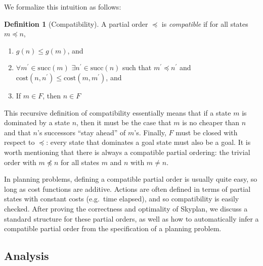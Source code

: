 \documentclass[letterpaper]{article}
\theoremstyle{plain} \newtheorem{theorem}{Theorem} \newtheorem{proposition}{Proposition} \newtheorem{lemma}{Lemma}
\theoremstyle{definition} \newtheorem{definition}{Definition} \newtheorem{conjecture}{Conjecture} \newtheorem*{example}{Example}
\theoremstyle{remark} \newtheorem*{remark}{Remark} \newtheorem*{note}{Note} \newtheorem{case}{Case}
\begin{document}
We formalize this intuition as follows:
\begin{definition}[Compatibility]
	\label{def-compatibility}
  A partial order $\preceq$ is \textit{compatible} if for all states $m \preceq n$,
  \begin{enumerate}
    \item $g(n) \le g(m)$, and 
    \item $\forall m^\prime \in \mathrm{succ}(m)$ $\exists n^\prime \in
      \mathrm{succ}(n)$ such that $m^\prime \preceq n^\prime$ and
      $\mathrm{cost}(n,n^\prime) \le \mathrm{cost}(m,m^\prime)$, and
    \item If $m \in F$, then $n \in F$
  \end{enumerate}
\end{definition}
This recursive definition of compatibility essentially means that
if a state $m$ is dominated by a state $n$, then it must be the
case that $m$ is no cheaper than $n$ and that $n$'s successors
``stay ahead'' of $m$'s. Finally, $F$ must be closed with respect
to $\preceq$: every state that dominates a goal state must also be
a goal. It is worth mentioning that there is always a compatible
partial ordering: the trivial order with $m \npreceq n$ for all
states $m$ and $n$ with $m \ne n$. %


In planning problems, defining a compatible partial order is usually
quite easy, so long as cost functions are additive.  Actions are
often defined in terms of partial states with constant costs (e.g.\
time elapsed), and so compatibility is easily checked.  After proving
the correctness and optimality of Skyplan, we discuss a standard
structure for these partial orders, as well as how to automatically
infer a compatible partial order from the specification of a planning problem.

\subsection{Analysis}
\end{document}
